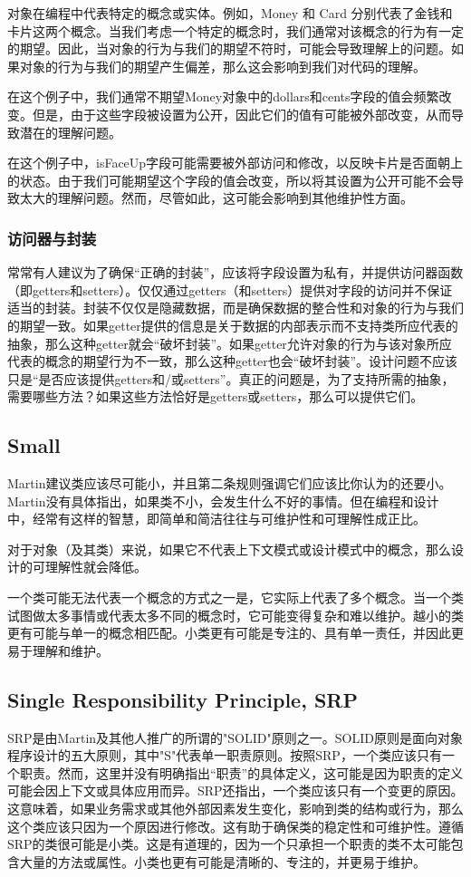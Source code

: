 \documentclass[]{ctexbook}
\begin{document}
对象在编程中代表特定的概念或实体。例如，Money 和 Card 分别代表了金钱和卡片这两个概念。当我们考虑一个特定的概念时，我们通常对该概念的行为有一定的期望。因此，当对象的行为与我们的期望不符时，可能会导致理解上的问题。如果对象的行为与我们的期望产生偏差，那么这会影响到我们对代码的理解。

在这个例子中，我们通常不期望Money对象中的dollars和cents字段的值会频繁改变。但是，由于这些字段被设置为公开，因此它们的值有可能被外部改变，从而导致潜在的理解问题。

在这个例子中，isFaceUp字段可能需要被外部访问和修改，以反映卡片是否面朝上的状态。由于我们可能期望这个字段的值会改变，所以将其设置为公开可能不会导致太大的理解问题。然而，尽管如此，这可能会影响到其他维护性方面。

\subsubsection{访问器与封装}

常常有人建议为了确保“正确的封装”，应该将字段设置为私有，并提供访问器函数（即getters和setters）。仅仅通过getters（和setters）提供对字段的访问并不保证适当的封装。封装不仅仅是隐藏数据，而是确保数据的整合性和对象的行为与我们的期望一致。如果getter提供的信息是关于数据的内部表示而不支持类所应代表的抽象，那么这种getter就会“破坏封装”。如果getter允许对象的行为与该对象所应代表的概念的期望行为不一致，那么这种getter也会“破坏封装”。设计问题不应该只是“是否应该提供getters和/或setters”。真正的问题是，为了支持所需的抽象，需要哪些方法？如果这些方法恰好是getters或setters，那么可以提供它们。

\subsection{Small}
Martin建议类应该尽可能小，并且第二条规则强调它们应该比你认为的还要小。Martin没有具体指出，如果类不小，会发生什么不好的事情。但在编程和设计中，经常有这样的智慧，即简单和简洁往往与可维护性和可理解性成正比。

对于对象（及其类）来说，如果它不代表上下文模式或设计模式中的概念，那么设计的可理解性就会降低。

一个类可能无法代表一个概念的方式之一是，它实际上代表了多个概念。当一个类试图做太多事情或代表太多不同的概念时，它可能变得复杂和难以维护。越小的类更有可能与单一的概念相匹配。小类更有可能是专注的、具有单一责任，并因此更易于理解和维护。

\subsection{Single Responsibility Principle, SRP}
SRP是由Martin及其他人推广的所谓的"SOLID"原则之一。SOLID原则是面向对象程序设计的五大原则，其中"S"代表单一职责原则。按照SRP，一个类应该只有一个职责。然而，这里并没有明确指出“职责”的具体定义，这可能是因为职责的定义可能会因上下文或具体应用而异。SRP还指出，一个类应该只有一个变更的原因。这意味着，如果业务需求或其他外部因素发生变化，影响到类的结构或行为，那么这个类应该只因为一个原因进行修改。这有助于确保类的稳定性和可维护性。遵循SRP的类很可能是小类。这是有道理的，因为一个只承担一个职责的类不太可能包含大量的方法或属性。小类也更有可能是清晰的、专注的，并更易于维护。
\end{document}
